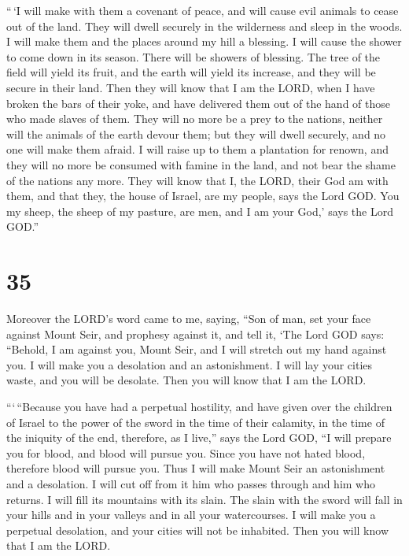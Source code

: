  ``\,`I will make with them a covenant of peace, and will
cause evil animals to cease out of the land. They will dwell securely in
the wilderness and sleep in the woods.  I will make them
and the places around my hill a blessing. I will cause the shower to
come down in its season. There will be showers of blessing.
 The tree of the field will yield its fruit, and the earth
will yield its increase, and they will be secure in their land. Then
they will know that I am the LORD, when I have broken the bars of their
yoke, and have delivered them out of the hand of those who made slaves
of them.  They will no more be a prey to the nations,
neither will the animals of the earth devour them; but they will dwell
securely, and no one will make them afraid.  I will raise
up to them a plantation for renown, and they will no more be consumed
with famine in the land, and not bear the shame of the nations any more.
 They will know that I, the LORD, their God am with them,
and that they, the house of Israel, are my people, says the Lord GOD.
 You my sheep, the sheep of my pasture, are men, and I am
your God,' says the Lord GOD.''

\hypertarget{section-33}{%
\section{35}\label{section-33}}

 Moreover the LORD's word came to me, saying, 
``Son of man, set your face against Mount Seir, and prophesy against it,
 and tell it, `The Lord GOD says: ``Behold, I am against
you, Mount Seir, and I will stretch out my hand against you. I will make
you a desolation and an astonishment.  I will lay your
cities waste, and you will be desolate. Then you will know that I am the
LORD.

 ```\,``Because you have had a perpetual hostility, and have
given over the children of Israel to the power of the sword in the time
of their calamity, in the time of the iniquity of the end, 
therefore, as I live,'' says the Lord GOD, ``I will prepare you for
blood, and blood will pursue you. Since you have not hated blood,
therefore blood will pursue you.  Thus I will make Mount
Seir an astonishment and a desolation. I will cut off from it him who
passes through and him who returns.  I will fill its
mountains with its slain. The slain with the sword will fall in your
hills and in your valleys and in all your watercourses.  I
will make you a perpetual desolation, and your cities will not be
inhabited. Then you will know that I am the LORD.

